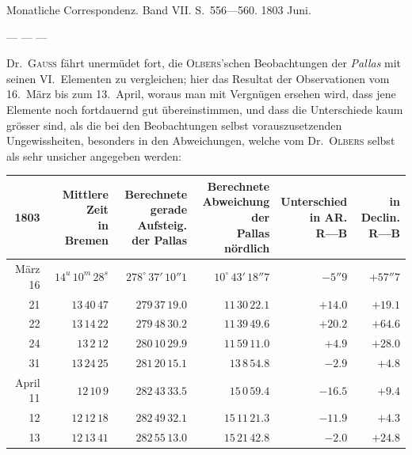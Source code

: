 Monatliche Correspondenz. Band VII. S.\ 556—560. 1803 Juni.


— — —

Dr.\ \textsc{Gauss} fährt unermüdet fort, die \textsc{Olbers}'schen Beobachtungen der \emph{Pallas} mit seinen VI.\ Elementen zu vergleichen; hier das Resultat der Observationen vom 16.\ März bis zum 13.\ April, woraus man mit Vergnügen ersehen wird, dass jene Elemente noch fortdauernd gut übereinstimmen, und dass die Unterschiede kaum grösser sind, als die bei den Beobachtungen selbst vorauszusetzenden Ungewissheiten, besonders in den Abweichungen, welche vom Dr.\ \textsc{Olbers} selbst als sehr unsicher angegeben werden:

\begin{center}
\begingroup\fontsize{8}{10}\selectfont\setlength{\tabcolsep}{3pt}\renewcommand{\arraystretch}{1.12}
\begin{tabular}{r|r|r|r|r|r}
1803 & \shortstack{Mittlere Zeit\\in\\Bremen} & \shortstack{Berechnete\\gerade Aufsteig.\\der Pallas} & \shortstack{Berechnete\\Abweichung der\\Pallas nördlich} & \shortstack{Unterschied\\in AR.\\R—B} & \shortstack{in Declin.\\R—B} \\ \hline
März 16 & $14^u\,10^m\,28^s$ & $278^\circ\,37'\,10''1$ & $10^\circ\,43'\,18''7$ & $-5''9$ & $+57''7$ \\
21 & $13\,40\,47$ & $279\,37\,19.0$ & $11\,30\,22.1$ & $+14.0$ & $+19.1$ \\
22 & $13\,14\,22$ & $279\,48\,30.2$ & $11\,39\,49.6$ & $+20.2$ & $+64.6$ \\
24 & $13\,2\,12$ & $280\,10\,29.9$ & $11\,59\,11.0$ & $+4.9$ & $+28.0$ \\
31 & $13\,24\,25$ & $281\,20\,15.1$ & $13\,8\,54.8$ & $-2.9$ & $+4.8$ \\
April 11 & $12\,10\,9$ & $282\,43\,33.5$ & $15\,0\,59.4$ & $-16.5$ & $+9.4$ \\
12 & $12\,12\,18$ & $282\,49\,32.1$ & $15\,11\,21.3$ & $-11.9$ & $+4.3$ \\
13 & $12\,13\,41$ & $282\,55\,13.0$ & $15\,21\,42.8$ & $-2.0$ & $+24.8$ \\
\end{tabular}\endgroup
\end{center}

